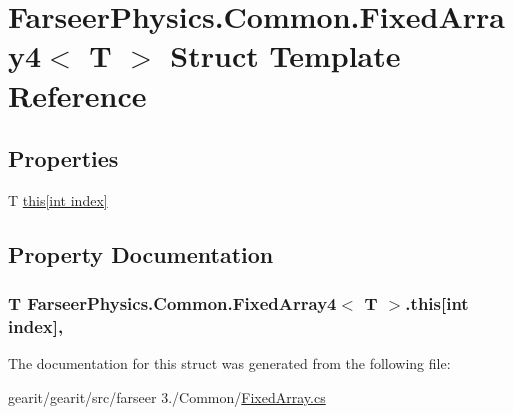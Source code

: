 \hypertarget{struct_farseer_physics_1_1_common_1_1_fixed_array4_3_01_t_01_4}{\section{Farseer\+Physics.\+Common.\+Fixed\+Array4$<$ T $>$ Struct Template Reference}
\label{struct_farseer_physics_1_1_common_1_1_fixed_array4_3_01_t_01_4}
}
\subsection*{Properties}
\begin{DoxyCompactItemize}
\item 
T \hyperlink{struct_farseer_physics_1_1_common_1_1_fixed_array4_3_01_t_01_4_a00bb12e93865230d4665c3f9abe628c3}{this\mbox{[}int index\mbox{]}}
\end{DoxyCompactItemize}


\subsection{Property Documentation}
\hypertarget{struct_farseer_physics_1_1_common_1_1_fixed_array4_3_01_t_01_4_a00bb12e93865230d4665c3f9abe628c3}{
\subsubsection[{this[int index]}]{\setlength{\rightskip}{0pt plus 5cm}T Farseer\+Physics.\+Common.\+Fixed\+Array4$<$ T $>$.this\mbox{[}int index\mbox{]}\hspace{0.3cm}{\ttfamily [get]}, {\ttfamily [set]}}}\label{struct_farseer_physics_1_1_common_1_1_fixed_array4_3_01_t_01_4_a00bb12e93865230d4665c3f9abe628c3}


The documentation for this struct was generated from the following file\+:\begin{DoxyCompactItemize}
\item 
gearit/gearit/src/farseer 3./\+Common/\hyperlink{_fixed_array_8cs}{Fixed\+Array.\+cs}\end{DoxyCompactItemize}

